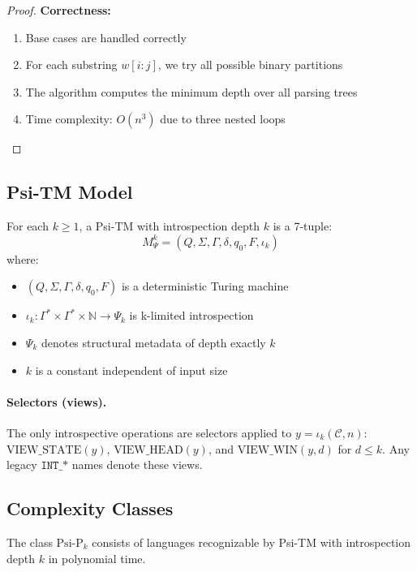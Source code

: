 \begin{proof}
\textbf{Correctness:}
\begin{enumerate}
\item Base cases are handled correctly
\item For each substring $w[i:j]$, we try all possible binary partitions
\item The algorithm computes the minimum depth over all parsing trees
\item Time complexity: $O(n^3)$ due to three nested loops
\end{enumerate}
\end{proof}

\subsection{Psi-TM Model}

\begin{definition}
For each $k \geq 1$, a Psi-TM with introspection depth $k$ is a 7-tuple:
$$M_\Psi^k = (Q, \Sigma, \Gamma, \delta, q_0, F, \iota_k)$$
where:
\begin{itemize}
\item $(Q, \Sigma, \Gamma, \delta, q_0, F)$ is a deterministic Turing machine
\item $\iota_k: \Gamma^* \times \Gamma^* \times \mathbb{N} \to \Psi_k$ is k-limited introspection
\item $\Psi_k$ denotes structural metadata of depth exactly $k$
\item $k$ is a constant independent of input size
\end{itemize}
\end{definition}

\paragraph{Selectors (views).} The only introspective operations are selectors applied to $y=\iota_k(\mathcal{C},n)$: $\mathrm{VIEW\_STATE}(y)$, $\mathrm{VIEW\_HEAD}(y)$, and $\mathrm{VIEW\_WIN}(y,d)$ for $d\le k$. Any legacy $\texttt{INT\_*}$ names denote these views.

\subsection{Complexity Classes}

\begin{definition}
The class $\text{Psi-P}_k$ consists of languages recognizable by Psi-TM with introspection depth $k$ in polynomial time.
\end{definition}

